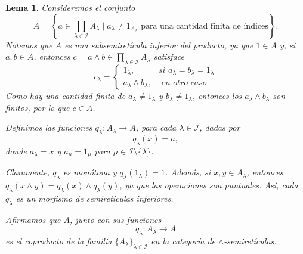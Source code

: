 \documentclass[12pt,letterpaper,titlepage]{article}
\newtheorem{lemma}{Lema}
\theoremstyle{definition}
\renewcommand\inf{\wedge}
\newcommand\scr[1]{\mathscr{#1}}
\newcommand\<{\langle}
\renewcommand\>{\rangle}
\begin{document}
\begin{lemma}
    Consideremos el conjunto
    \[
    A=
    \left\{ a\in\prod_{\lambda\in\scr I} A_\lambda
    \mid a_\lambda\neq 1_{A_\lambda}
    \text{ para una cantidad finita de índices} \right\}.
    \]
    Notemos que $A$ es una subsemiretícula inferior del producto,
    ya que $1\in A$ y, si $a,b\in A$, entonces
    $c=a\inf b\in \prod_{\lambda\in\scr I} A_\lambda$
    satisface
    \[c_\lambda=
    \begin{cases}
        1_\lambda, & \textit{si }a_\lambda=b_\lambda=1_\lambda\\
        a_\lambda\wedge b_\lambda, & \textit{ en otro caso}
    \end{cases}
    \]
    Como hay una cantidad finita de
    $a_\lambda\neq 1_\lambda$ y $b_\lambda\neq 1_\lambda$,
    entonces los $a_\lambda\wedge b_\lambda$ son finitos,
    por lo que $c\in A$.
    
    Definimos las funciones
    $q_\lambda\colon A_\lambda\to A$,
    para cada $\lambda\in \scr I$, dadas por 
    \[q_\lambda(x)=a,\]
    donde $a_\lambda=x$ y $a_\mu =1_{\mu}$
    para $\mu\in \scr I\setminus \{\lambda\}$.
    
    Claramente, $q_\lambda$ es monótona y $q_\lambda(1_\lambda)=1$.
    Además, si $x,y\in A_\lambda$, entonces
    $q_\lambda(x\wedge y)=q_\lambda(x)\wedge q_\lambda(y)$,
    ya que las operaciones son puntuales.
    Así, cada $q_\lambda$ es un morfismo de semiretículas
    inferiores.
    
    Afirmamos que $A$, junto con sus funciones
    \[
        q_\lambda:A_\lambda\to A
    \]
    es el coproducto de la familia
    $\{A_\lambda\}_{\lambda\in\scr I}$
    en la categoría de $\inf$-semiretículas.
\end{lemma}
\end{document}
